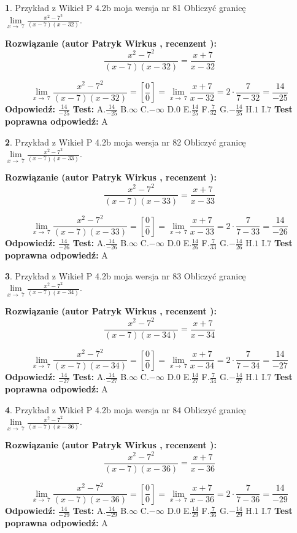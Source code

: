 \documentclass[12pt, a4paper]{article}
\theoremstyle{definition} %
\newtheorem{zad}{}
\newcommand{\zadStart}[1]{\begin{zad}#1\newline}
\newcommand{\zadStop}{\end{zad}}
\newcommand{\rozwStart}[2]{\noindent \textbf{Rozwiązanie (autor #1 , recenzent #2): }\newline}
\newcommand{\rozwStop}{\newline}
\newcommand{\odpStart}{\noindent \textbf{Odpowiedź:}\newline}
\newcommand{\odpStop}{\newline}
\newcommand{\testStart}{\noindent \textbf{Test:}\newline}
\newcommand{\testStop}{\newline}
\newcommand{\kluczStart}{\noindent \textbf{Test poprawna odpowiedź:}\newline}
\newcommand{\kluczStop}{\newline}
\begin{document}
\zadStart{Przykład z Wikieł P 4.2b moja wersja nr 81}
Obliczyć granicę $\lim\limits_{x\to\ 7}\frac{x^{2}-7^{2}}{(x-7)(x-32)}$.
\zadStop
\rozwStart{Patryk Wirkus}{}
$$\frac{x^{2}-7^{2}}{(x-7)(x-32)}=\frac{x+7}{x-32}$$

$$\lim\limits_{x\to\ 7}\frac{x^{2}-7^{2}}{(x-7)(x-32)}=[\frac{0}{0}]=\lim\limits_{x\to\ 7}\frac{x+7}{x-32}=2 \cdot \frac{7}{7-32} = \frac{14}{-25}$$
\rozwStop
\odpStart
$\frac{14}{-25}$
\odpStop
\testStart
A.$\frac{14}{-25}$
B.$\infty$
C.$-\infty$
D.$0$
E.$\frac{14}{25}$
F.$\frac{7}{32}$
G.$-\frac{14}{25}$
H.$1$
I.$7$
\testStop
\kluczStart
A
\kluczStop



\zadStart{Przykład z Wikieł P 4.2b moja wersja nr 82}
Obliczyć granicę $\lim\limits_{x\to\ 7}\frac{x^{2}-7^{2}}{(x-7)(x-33)}$.
\zadStop
\rozwStart{Patryk Wirkus}{}
$$\frac{x^{2}-7^{2}}{(x-7)(x-33)}=\frac{x+7}{x-33}$$

$$\lim\limits_{x\to\ 7}\frac{x^{2}-7^{2}}{(x-7)(x-33)}=[\frac{0}{0}]=\lim\limits_{x\to\ 7}\frac{x+7}{x-33}=2 \cdot \frac{7}{7-33} = \frac{14}{-26}$$
\rozwStop
\odpStart
$\frac{14}{-26}$
\odpStop
\testStart
A.$\frac{14}{-26}$
B.$\infty$
C.$-\infty$
D.$0$
E.$\frac{14}{26}$
F.$\frac{7}{33}$
G.$-\frac{14}{26}$
H.$1$
I.$7$
\testStop
\kluczStart
A
\kluczStop



\zadStart{Przykład z Wikieł P 4.2b moja wersja nr 83}
Obliczyć granicę $\lim\limits_{x\to\ 7}\frac{x^{2}-7^{2}}{(x-7)(x-34)}$.
\zadStop
\rozwStart{Patryk Wirkus}{}
$$\frac{x^{2}-7^{2}}{(x-7)(x-34)}=\frac{x+7}{x-34}$$

$$\lim\limits_{x\to\ 7}\frac{x^{2}-7^{2}}{(x-7)(x-34)}=[\frac{0}{0}]=\lim\limits_{x\to\ 7}\frac{x+7}{x-34}=2 \cdot \frac{7}{7-34} = \frac{14}{-27}$$
\rozwStop
\odpStart
$\frac{14}{-27}$
\odpStop
\testStart
A.$\frac{14}{-27}$
B.$\infty$
C.$-\infty$
D.$0$
E.$\frac{14}{27}$
F.$\frac{7}{34}$
G.$-\frac{14}{27}$
H.$1$
I.$7$
\testStop
\kluczStart
A
\kluczStop



\zadStart{Przykład z Wikieł P 4.2b moja wersja nr 84}
Obliczyć granicę $\lim\limits_{x\to\ 7}\frac{x^{2}-7^{2}}{(x-7)(x-36)}$.
\zadStop
\rozwStart{Patryk Wirkus}{}
$$\frac{x^{2}-7^{2}}{(x-7)(x-36)}=\frac{x+7}{x-36}$$

$$\lim\limits_{x\to\ 7}\frac{x^{2}-7^{2}}{(x-7)(x-36)}=[\frac{0}{0}]=\lim\limits_{x\to\ 7}\frac{x+7}{x-36}=2 \cdot \frac{7}{7-36} = \frac{14}{-29}$$
\rozwStop
\odpStart
$\frac{14}{-29}$
\odpStop
\testStart
A.$\frac{14}{-29}$
B.$\infty$
C.$-\infty$
D.$0$
E.$\frac{14}{29}$
F.$\frac{7}{36}$
G.$-\frac{14}{29}$
H.$1$
I.$7$
\testStop
\kluczStart
A
\kluczStop
\end{document}

